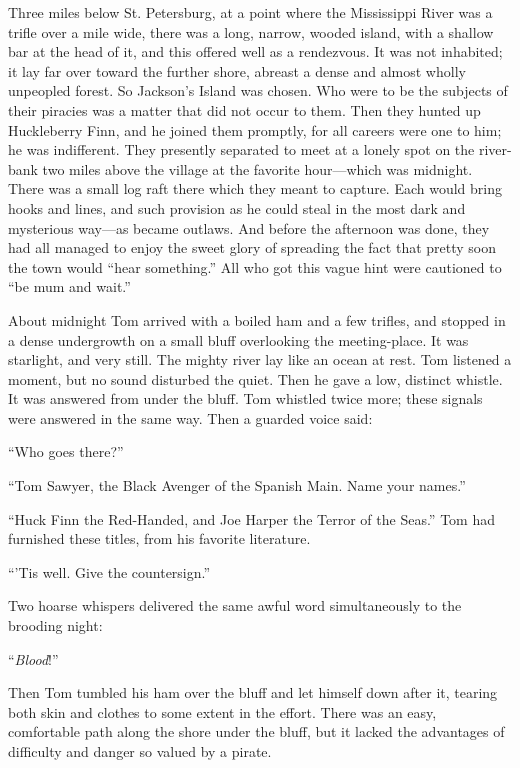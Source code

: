 \documentclass{book}
\begin{document}
Three miles below St. Petersburg, at a point where the Mississippi River was a trifle over a mile wide, there was a long, narrow, wooded island, with a shallow bar at the head of it, and this offered well as a rendezvous. It was not inhabited; it lay far over toward the further shore, abreast a dense and almost wholly unpeopled forest. So Jackson’s Island was chosen. Who were to be the subjects of their piracies was a matter that did not occur to them. Then they hunted up Huckleberry Finn, and he joined them promptly, for all careers were one to him; he was indifferent. They presently separated to meet at a lonely spot on the river-bank two miles above the village at the favorite hour—which was midnight. There was a small log raft there which they meant to capture. Each would bring hooks and lines, and such provision as he could steal in the most dark and mysterious way—as became outlaws. And before the afternoon was done, they had all managed to enjoy the sweet glory of spreading the fact that pretty soon the town would “hear something.” All who got this vague hint were cautioned to “be mum and wait.”

About midnight Tom arrived with a boiled ham and a few trifles, and stopped in a dense undergrowth on a small bluff overlooking the meeting-place. It was starlight, and very still. The mighty river lay like an ocean at rest. Tom listened a moment, but no sound disturbed the quiet. Then he gave a low, distinct whistle. It was answered from under the bluff. Tom whistled twice more; these signals were answered in the same way. Then a guarded voice said:

“Who goes there?”

“Tom Sawyer, the Black Avenger of the Spanish Main. Name your names.”

“Huck Finn the Red-Handed, and Joe Harper the Terror of the Seas.” Tom had furnished these titles, from his favorite literature.

“’Tis well. Give the countersign.”

Two hoarse whispers delivered the same awful word simultaneously to the brooding night:

“\emph{Blood}!”

Then Tom tumbled his ham over the bluff and let himself down after it, tearing both skin and clothes to some extent in the effort. There was an easy, comfortable path along the shore under the bluff, but it lacked the advantages of difficulty and danger so valued by a pirate.
\end{document}

